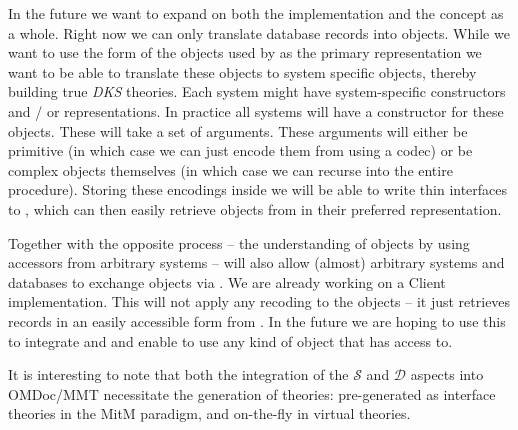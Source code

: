 In the future we want to expand on both the implementation and the concept as a whole. Right
now we can only translate database records into \MMT objects. While we want to use the form of
the objects used by \MMT as the primary representation we want to be able to translate these
objects to system specific objects, thereby building true \textit{DKS} theories. Each system
might have system-specific constructors and / or representations. In practice all systems will
have a constructor for these objects. These will take a set of arguments. These arguments will
either be primitive (in which case we can just encode them from \MMT using a codec) or be
complex objects themselves (in which case we can recurse into the entire procedure). Storing
these encodings inside \MMT we will be able to write thin interfaces to \MMT, which can then
easily retrieve objects from \MMT in their preferred representation.

Together with the opposite process -- the understanding of objects by using accessors from
arbitrary systems -- will also allow (almost) arbitrary systems and databases to exchange objects
via \MMT. We are already working on a \python Client implementation. This will not apply any
recoding to the objects -- it just retrieves records in an easily accessible form from \MMT. In
the future we are hoping to use this to integrate \MMT and \GAP and enable \GAP to use any kind
of object that \MMT has access to.

It is interesting to note that both the integration of the $\mathcal{S}$ and $\mathcal{D}$
aspects into OMDoc/MMT necessitate the generation of theories: pre-generated as interface
theories in the MitM paradigm, and on-the-fly in virtual theories. 


